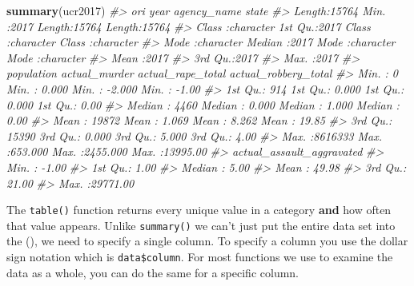 \documentclass[
  12pt,
]{book}
\newenvironment{Shaded}{\begin{snugshade}}{\end{snugshade}}
\newcommand{\CommentTok}[1]{\textcolor[rgb]{0.37,0.37,0.37}{\textit{#1}}}
\newcommand{\KeywordTok}[1]{\textcolor[rgb]{0.27,0.27,0.27}{\textbf{#1}}}
\newcommand{\NormalTok}[1]{#1}
\newcommand{\OperatorTok}[1]{\textcolor[rgb]{0.43,0.43,0.43}{\textbf{#1}}}
\begin{document}
\begin{Shaded}
\begin{Highlighting}[]
\KeywordTok{summary}\NormalTok{(ucr2017)}
\CommentTok{\#>      ori                 year      agency\_name           state          }
\CommentTok{\#>  Length:15764       Min.   :2017   Length:15764       Length:15764      }
\CommentTok{\#>  Class :character   1st Qu.:2017   Class :character   Class :character  }
\CommentTok{\#>  Mode  :character   Median :2017   Mode  :character   Mode  :character  }
\CommentTok{\#>                     Mean   :2017                                        }
\CommentTok{\#>                     3rd Qu.:2017                                        }
\CommentTok{\#>                     Max.   :2017                                        }
\CommentTok{\#>    population      actual\_murder     actual\_rape\_total  actual\_robbery\_total}
\CommentTok{\#>  Min.   :      0   Min.   :  0.000   Min.   :  {-}2.000   Min.   :   {-}1.00    }
\CommentTok{\#>  1st Qu.:    914   1st Qu.:  0.000   1st Qu.:   0.000   1st Qu.:    0.00    }
\CommentTok{\#>  Median :   4460   Median :  0.000   Median :   1.000   Median :    0.00    }
\CommentTok{\#>  Mean   :  19872   Mean   :  1.069   Mean   :   8.262   Mean   :   19.85    }
\CommentTok{\#>  3rd Qu.:  15390   3rd Qu.:  0.000   3rd Qu.:   5.000   3rd Qu.:    4.00    }
\CommentTok{\#>  Max.   :8616333   Max.   :653.000   Max.   :2455.000   Max.   :13995.00    }
\CommentTok{\#>  actual\_assault\_aggravated}
\CommentTok{\#>  Min.   :   {-}1.00         }
\CommentTok{\#>  1st Qu.:    1.00         }
\CommentTok{\#>  Median :    5.00         }
\CommentTok{\#>  Mean   :   49.98         }
\CommentTok{\#>  3rd Qu.:   21.00         }
\CommentTok{\#>  Max.   :29771.00}
\end{Highlighting}
\end{Shaded}

The \texttt{table()} function returns every unique value in a category \textbf{and} how often that value appears. Unlike \texttt{summary()} we can't just put the entire data set into the (), we need to specify a single column. To specify a column you use the dollar sign notation which is \texttt{data\$column}. For most functions we use to examine the data as a whole, you can do the same for a specific column.

\begin{Shaded}
\end{Shaded}
\end{document}
